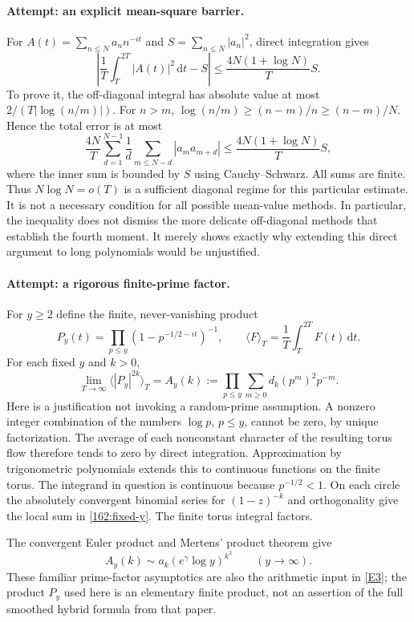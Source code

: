 \documentclass[11pt,a4paper]{article}
\newcommand{\dd}{\,\mathrm d}
\newcommand{\eref}[2]{\hyperlink{extra:#1:#2}{[E#2]}}
\numberwithin{equation}{section}
\begin{document}
\paragraph{Attempt: an explicit mean-square barrier.}
For $A(t)=\sum_{n\le N}a_n n^{-it}$ and
$S=\sum_{n\le N}|a_n|^2$, direct integration gives
\begin{equation}\label{162:mean-square}
 \left|\frac1T\int_T^{2T}|A(t)|^2\dd t-S\right|
 \le\frac{4N(1+\log N)}{T}S.
\end{equation}
To prove it, the off-diagonal integral has absolute value at most
$2/(T|\log(n/m)|)$. For $n>m$,
$\log(n/m)\ge(n-m)/n\ge(n-m)/N$. Hence the total error is at most
\[
 \frac{4N}{T}\sum_{d=1}^{N-1}\frac1d
       \sum_{m\le N-d}|a_ma_{m+d}|
 \le \frac{4N(1+\log N)}{T}S,
\]
where the inner sum is bounded by $S$ using Cauchy--Schwarz. All sums
are finite. Thus $N\log N=o(T)$ is a sufficient diagonal regime for this
particular estimate. It is not a necessary condition for all possible
mean-value methods. In particular, the inequality does not dismiss the
more delicate off-diagonal methods that establish the fourth moment.
It merely shows exactly why extending this direct argument to long
polynomials would be unjustified.

\paragraph{Attempt: a rigorous finite-prime factor.}
For $y\ge2$ define the finite, never-vanishing product
\[
 P_y(t)=\prod_{p\le y}(1-p^{-1/2-it})^{-1},\qquad
 \langle F\rangle_T=\frac1T\int_T^{2T}F(t)\dd t.
\]
For each fixed $y$ and $k>0$,
\begin{equation}\label{162:fixed-y}
 \lim_{T\to\infty}\langle|P_y|^{2k}\rangle_T
 =A_y(k):=\prod_{p\le y}\sum_{m\ge0}d_k(p^m)^2p^{-m}.
\end{equation}
Here is a justification not invoking a random-prime assumption. A nonzero
integer combination of the numbers $\log p$, $p\le y$, cannot be zero,
by unique factorization. The average of each nonconstant character of
the resulting torus flow therefore tends to zero by direct integration.
Approximation by trigonometric polynomials extends this to continuous
functions on the finite torus. The integrand in question is continuous
because $p^{-1/2}<1$. On each circle the absolutely convergent binomial
series for $(1-z)^{-k}$ and orthogonality give the local sum in
\eqref{162:fixed-y}. The finite torus integral factors.

The convergent Euler product and Mertens' product theorem give
\begin{equation}\label{162:Ay}
 A_y(k)\sim a_k(e^\gamma\log y)^{k^2}
 \qquad(y\to\infty).
\end{equation}
These familiar prime-factor asymptotics are also the arithmetic input in
\eref{162}{3}; the product $P_y$ used here is an elementary finite product,
not an assertion of the full smoothed hybrid formula from that paper.
\end{document}
